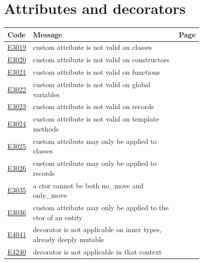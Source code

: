 
\clearpage
\section{Attributes and decorators}
\label{sec:codes:attributes}

\begin{longtable}{@{}l p{0.78\linewidth} r@{}}
\toprule Code & Message & Page\\ \midrule \endhead
\hyperref[sec:codes:e3019]{E3019} & custom attribute \errhole{} is not valid on classes & \pageref{sec:codes:e3019}\\
\hyperref[sec:codes:e3020]{E3020} & custom attribute \errhole{} is not valid on constructors & \pageref{sec:codes:e3020}\\
\hyperref[sec:codes:e3021]{E3021} & custom attribute \errhole{} is not valid on functions & \pageref{sec:codes:e3021}\\
\hyperref[sec:codes:e3022]{E3022} & custom attribute \errhole{} is not valid on global variables & \pageref{sec:codes:e3022}\\
\hyperref[sec:codes:e3023]{E3023} & custom attribute \errhole{} is not valid on records & \pageref{sec:codes:e3023}\\
\hyperref[sec:codes:e3024]{E3024} & custom attribute \errhole{} is not valid on template methods & \pageref{sec:codes:e3024}\\
\hyperref[sec:codes:e3025]{E3025} & custom attribute \errhole{} may only be applied to classes & \pageref{sec:codes:e3025}\\
\hyperref[sec:codes:e3026]{E3026} & custom attribute \errhole{} may only be applied to records & \pageref{sec:codes:e3026}\\
\hyperref[sec:codes:e3035]{E3035} & a ctor cannot be both no\_move and only\_move & \pageref{sec:codes:e3035}\\
\hyperref[sec:codes:e3036]{E3036} & custom attribute \errhole{} may only be applied to the ctor of an entity & \pageref{sec:codes:e3036}\\
\hyperref[sec:codes:e4041]{E4041} & decorator is not applicable on inner types, already deeply mutable & \pageref{sec:codes:e4041}\\
\hyperref[sec:codes:e4240]{E4240} & decorator \errhole{} is not applicable in that context & \pageref{sec:codes:e4240}\\
\bottomrule
\end{longtable}

